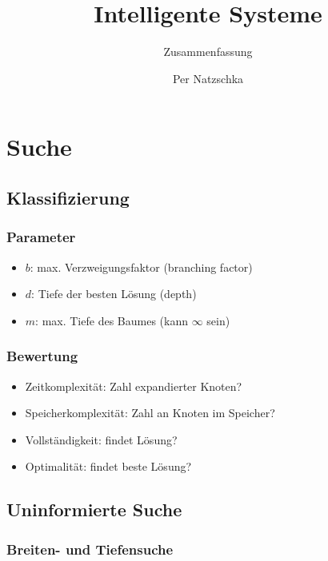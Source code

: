 \documentclass[nonacm=true, language=german]{acmart}
\title{Intelligente Systeme}
\subtitle{Zusammenfassung}
\author{Per Natzschka}
\begin{document}
\maketitle

\tableofcontents

\newpage
\section{Suche}

\subsection{Klassifizierung}

\subsubsection{Parameter}

\begin{itemize}
    \item $b$: max. Verzweigungsfaktor (branching factor)
    \item $d$: Tiefe der besten Lösung (depth)
    \item $m$: max. Tiefe des Baumes (kann $ \infty $ sein)
\end{itemize}

\subsubsection{Bewertung}

\begin{itemize}
    \item Zeitkomplexität: Zahl expandierter Knoten?
    \item Speicherkomplexität: Zahl an Knoten im Speicher?
    \item Vollständigkeit: findet Lösung?
    \item Optimalität: findet beste Lösung?
\end{itemize}

\subsection{Uninformierte Suche}

\subsubsection{Breiten- und Tiefensuche}
\end{document}

